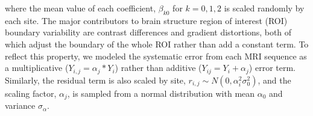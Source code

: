 where the mean value of each coefficient,
$\beta_{k0}$ for  $k=0,1,2$ is scaled randomly by each site. The major contributors to brain structure region of interest (ROI) boundary variability are contrast differences and gradient distortions, both of which adjust the boundary of the whole ROI rather than add a constant term. To reflect this property, we modeled the systematic error from each MRI sequence as a multiplicative ($Y_{i,j} = \alpha_j*Y_i$) rather than additive ($Y_{ij} = Y_i + \alpha_j$) error term. Similarly, the residual term is also scaled by site, $r_{i,j} \sim N(0,\alpha_i^2\sigma_0^2)$, and the scaling factor, $\alpha_j$, is sampled from a normal distribution with mean $\alpha_0$ and variance $\sigma_{\alpha}$.